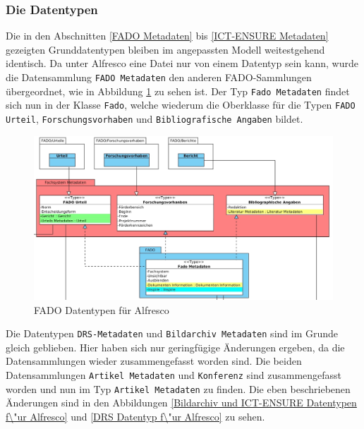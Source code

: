 \subsubsection{Die Datentypen}\label{Die Datentypen}
Die in den Abschnitten \ref{FADO Metadaten} bis \ref{ICT-ENSURE Metadaten} gezeigten Grunddatentypen bleiben im angepassten Modell weitestgehend identisch. Da unter Alfresco eine Datei nur von einem Datentyp sein kann, wurde die Datensammlung \texttt{FADO Metadaten} den anderen \ac{FADO}-Sammlungen \"ubergeordnet, wie in Abbildung \ref{Fado Datentypen f\"ur Alfresco} zu sehen ist. Der Typ \texttt{Fado Metadaten} findet sich nun in der Klasse \texttt{Fado}, welche wiederum die Oberklasse f\"ur die Typen \texttt{FADO Urteil}, \texttt{Forschungsvorhaben} und \texttt{Bibliografische Angaben} bildet.

\begin{figure}[!ht]
\centering
\includegraphics[width=16cm]{Bilder/AlfrescoModell/Fado-Datentypen.jpg}
\caption{FADO Datentypen f\"ur Alfresco}
\label{Fado Datentypen f\"ur Alfresco}
\centering
\end{figure}

Die Datentypen \texttt{DRS-Metadaten} und \texttt{Bildarchiv Metadaten} sind im Grunde gleich geblieben. Hier haben sich nur geringf\"ugige \"Anderungen ergeben, da die Datensammlungen wieder zusammengefasst worden sind. Die beiden Datensammlungen \texttt{Artikel Metadaten} und \texttt{Konferenz} sind zusammengefasst worden und nun im Typ \texttt{Artikel Metadaten} zu finden.
Die eben beschriebenen \"Anderungen sind in den Abbildungen \ref{Bildarchiv und ICT-ENSURE Datentypen f\"ur Alfresco} und \ref{DRS Datentyp f\"ur Alfresco} zu sehen.

